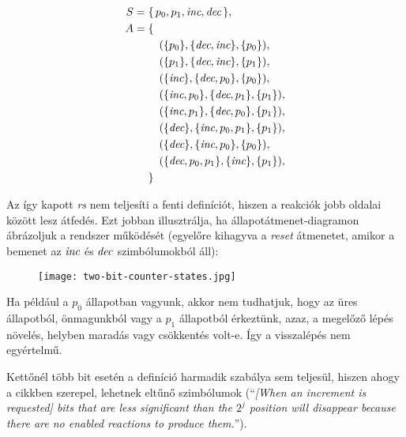 \documentclass[12pt]{article}
\begin{document}
    \begin{align*}
        S = \; & \{ \, p_{0}, p_{1},  \textit{inc}, \textit{dec} \, \}, \\
        A = \; & \{ \\
            & \quad (\{ p_{0} \}, \{ \textit{dec}, \textit{inc} \}, \{ p_{0} \}), \\
            & \quad (\{ p_{1} \}, \{ \textit{dec}, \textit{inc} \}, \{ p_{1} \}), \\
            & \quad (\{ \textit{inc} \}, \{ \textit{dec}, p_{0} \}, \{ p_{0} \}), \\
            & \quad (\{ \textit{inc}, p_{0} \}, \{ \textit{dec}, p_{1} \}, \{ p_{1} \}), \\
            & \quad (\{ \textit{inc}, p_{1} \}, \{ \textit{dec}, p_{0} \}, \{ p_{1} \}), \\
            & \quad (\{ \textit{dec} \}, \{ \textit{inc}, p_{0}, p_{1} \}, \{ p_{1} \}), \\
            & \quad (\{ \textit{dec} \}, \{ \textit{inc}, p_{0} \}, \{ p_{0} \}), \\
            & \quad (\{ \textit{dec}, p_{0}, p_{1} \}, \{ \textit{inc} \}, \{ p_{1} \}), \\
        \; &\}
    \end{align*}

    Az így kapott \textit{rs} nem teljesíti a fenti definíciót, hiszen a reakciók jobb oldalai között lesz átfedés. Ezt jobban illusztrálja, ha állapotátmenet-diagramon ábrázoljuk a rendszer működését (egyelőre kihagyva a \textit{reset} átmenetet, amikor a bemenet az $\textit{inc}$ és $\textit{dec}$ szimbólumokból áll):

    \begin{figure}[h]
        \centering
        \texttt{[image: two-bit-counter-states.jpg]}
    \end{figure}

    Ha például a $p_{0}$ állapotban vagyunk, akkor nem tudhatjuk, hogy az üres állapotból, önmagunkból vagy a $p_{1}$ állapotból érkeztünk, azaz, a megelőző lépés növelés, helyben maradás vagy csökkentés volt-e. Így a visszalépés nem egyértelmű.

    Kettőnél több bit esetén a definíció harmadik szabálya sem teljesül, hiszen ahogy a cikkben szerepel, lehetnek eltűnő szimbólumok (\enquote{\textit{[When an increment is requested] bits that are less significant than the $2^{j}$ position will disappear because there are no enabled reactions to produce them.}}).
\end{document}
